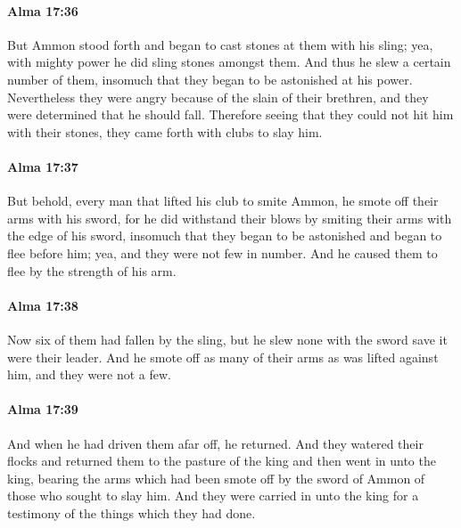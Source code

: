 		\paragraph{Alma 17:36} %
			\label{ALMA-17-36}

			But Ammon stood forth and began to cast stones at them with his sling;
			yea, with mighty power he did sling stones amongst them.
			And thus he slew a certain number of them,
			insomuch that they began to be astonished at his power.
			Nevertheless they were angry because of the slain of their brethren,
			and they were determined that he should fall.
			Therefore seeing that they could not hit him with their stones,
			they came forth with clubs to slay him.

		\paragraph{Alma 17:37} %
			\label{ALMA-17-37}

			But behold, every man that lifted his club to smite Ammon,
			he smote off their arms with his sword,
			for he did withstand their blows
			by smiting their arms with the edge of his sword,
			insomuch that they began to be astonished and began to flee before him;
			yea, and they were not few in number.
			And he caused them to flee by the strength of his arm.

		\paragraph{Alma 17:38} %
			\label{ALMA-17-38}

			Now six of them had fallen by the sling,
			but he slew none with the sword save it were their leader.
			And he smote off as many of their arms as was lifted against him,
			and they were not a few.

		\paragraph{Alma 17:39} %
			\label{ALMA-17-39}

			And when he had driven them afar off, he returned.
			And they watered their flocks and returned them to the pasture of the king
			and then went in unto the king,
			bearing the arms which had been smote off by the sword of Ammon
			of those who sought to slay him.
			And they were carried in unto the king
			for a testimony of the things which they had done.

